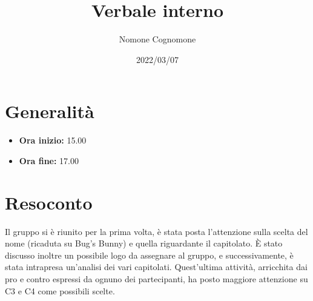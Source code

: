 \documentclass{classes/base}
\title{Verbale interno}
\date{2022/03/07}
\author{Nomone Cognomone}
\renewcommand{\maketitle}{
    
}
\begin{document}
    \maketitle

    \section{Generalità}
    \begin{itemize}
        \item \textbf{Ora inizio:} 15.00
        \item \textbf{Ora fine:} 17.00
    \end{itemize}

    \section{Resoconto}
    Il gruppo si è riunito per la prima volta, è stata posta l'attenzione sulla scelta del nome (ricaduta su Bug's Bunny) e quella riguardante il capitolato.  
    È stato discusso inoltre un possibile logo da assegnare al gruppo, e successivamente, è stata intrapresa un'analisi dei vari capitolati.
    Quest'ultima attività, arricchita dai pro e contro espressi da ognuno dei partecipanti, ha posto maggiore attenzione su C3 e C4 come possibili scelte.
\end{document}
